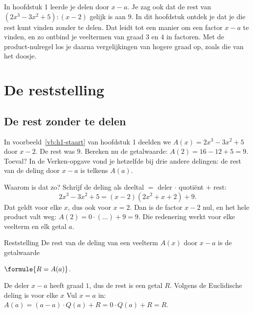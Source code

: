 In hoofdstuk 1 leerde je delen door $x - a$. Je zag ook dat de rest van $(2x^3 - 3x^2 + 5) : (x - 2)$ gelijk is aan $9$. In dit hoofdstuk ontdek je dat je die rest kunt vinden zonder te delen. Dat leidt tot een manier om een factor $x - a$ te vinden, en zo ontbind je veeltermen van graad $3$ en $4$ in factoren. Met de product-nulregel los je daarna vergelijkingen van hogere graad op, zoals die van het doosje.

\begin{oefeningen}[Start]

\end{oefeningen}

\section{De reststelling}

\subsection{De rest zonder te delen}

In voorbeeld~\ref{vb:h1-staart} van hoofdstuk 1 deelden we $A(x) = 2x^3 - 3x^2 + 5$ door $x - 2$. De rest was $9$. Bereken nu de getalwaarde: $A(2) = 16 - 12 + 5 = 9$. Toeval? In de Verken-opgave vond je hetzelfde bij drie andere delingen: de rest van de deling door $x - a$ is telkens $A(a)$.

Waarom is dat zo? Schrijf de deling als deeltal $=$ deler $\cdot$ quotiënt $+$ rest:
\[2x^3 - 3x^2 + 5 = (x - 2)(2x^2 + x + 2) + 9.\]
Dat geldt voor elke $x$, dus ook voor $x = 2$. Dan is de factor $x - 2$ nul, en het hele product valt weg: $A(2) = 0 \cdot (\ldots) + 9 = 9$. Die redenering werkt voor elke veelterm en elk getal $a$.

\begin{theorie}
\begin{stelling}{Reststelling}
De rest van de deling van een veelterm $A(x)$ door $x - a$ is de getalwaarde

\qquad $\formule{R = A(a)}$.
\end{stelling}
\begin{bewijs}
De deler $x - a$ heeft graad $1$, dus de rest is een getal $R$. Volgens de Euclidische deling is voor elke $x$
Vul $x = a$ in: $A(a) = (a - a) \cdot Q(a) + R = 0 \cdot Q(a) + R = R$.
\end{bewijs}
\end{theorie}

